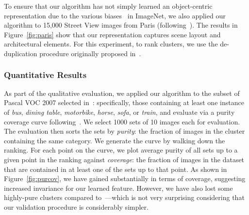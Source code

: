 \documentclass[10pt,twocolumn,letterpaper]{article}
\begin{document}
To ensure that our algorithm has not simply learned an object-centric representation due to the various biases~\cite{torralba11} in ImageNet, we also applied our algorithm to 15,000 Street View images from Paris (following~\cite{doersch2012makes}).  The results in Figure~\ref{fig:paris} show that our representation captures scene layout and architectural elements. For this experiment, to rank clusters, we use the de-duplication procedure originally proposed in~\cite{doersch2012makes}.





\vspace{-0.15in}
\subsubsection{Quantitative Results} \label{quantitative}\vspace{-0.05in} 
As part of the qualitative evaluation, we applied our algorithm to the subset of Pascal VOC 2007 selected in~\cite{singh2012unsupervised}: specifically, those containing at least one instance of \textit{bus}, \textit{dining table}, \textit{motorbike}, \textit{horse}, \textit{sofa}, or \textit{train}, and evaluate via a purity coverage curve following~\cite{doersch2014context}.  We select 1000 sets of 10 images each for evaluation.  The evaluation then sorts the sets by \textit{purity}: the fraction of images in the cluster containing the same category.  We generate the curve by walking down the ranking.  For each point on the curve, we plot average purity of all sets up to a given point in the ranking against \textit{coverage}: the fraction of images in the dataset that are contained in at least one of the sets up to that point.  As shown in Figure~\ref{fig:purcov}, we have gained substantially in terms of coverage, suggesting increased invariance for our learned feature.  However, we have also lost some highly-pure clusters compared to~\cite{doersch2014context}---which is not very surprising considering that our validation procedure is considerably simpler.  
\end{document}
